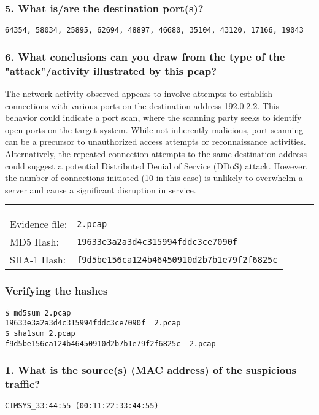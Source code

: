 \subsubsection*{5. What is/are the destination port(s)?}
\texttt{64354, 58034, 25895, 62694, 48897, 46680, 35104, 43120, 17166, 19043}
\subsubsection*{6. What conclusions can you draw from the type of the "attack"/activity illustrated by this pcap?}
The network activity observed appears to involve attempts to establish connections with various ports on the destination address 192.0.2.2. This behavior could indicate a port scan, where the scanning party seeks to identify open ports on the target system. While not inherently malicious, port scanning can be a precursor to unauthorized access attempts or reconnaissance activities. Alternatively, the repeated connection attempts to the same destination address could suggest a potential Distributed Denial of Service (DDoS) attack. However, the number of connections initiated (10 in this case) is unlikely to overwhelm a server and cause a significant disruption in service.

\noindent\rule{\textwidth}{1pt}
\vspace{-0.8cm}
\begin{table}[h]
\begin{tabular}{ll}
Evidence file: & \texttt{2.pcap}                                 \\
MD5 Hash:      & \texttt{19633e3a2a3d4c315994fddc3ce7090f}         \\
SHA-1 Hash:    & \texttt{f9d5be156ca124b46450910d2b7b1e79f2f6825c}
\end{tabular}
\end{table}
\vspace{-0.8cm}
\subsubsection*{Verifying the hashes}
\begin{verbatim}
$ md5sum 2.pcap 
19633e3a2a3d4c315994fddc3ce7090f  2.pcap
$ sha1sum 2.pcap 
f9d5be156ca124b46450910d2b7b1e79f2f6825c  2.pcap
\end{verbatim}
\subsubsection*{1. What is the source(s) (MAC address) of the suspicious traffic?}
\texttt{CIMSYS\_33:44:55 (00:11:22:33:44:55)}
